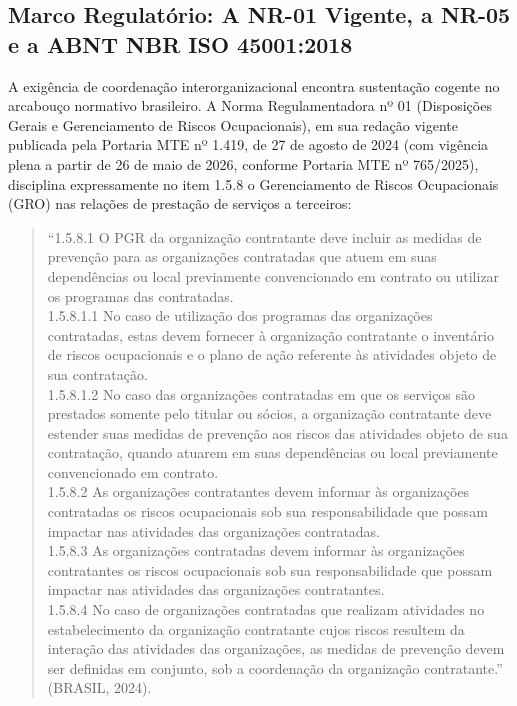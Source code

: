 \documentclass[12pt,a4paper]{article}
\begin{document}
\subsection{Marco Regulatório: A NR-01 Vigente, a NR-05 e a ABNT NBR ISO 45001:2018}

A exigência de coordenação interorganizacional encontra sustentação cogente no arcabouço normativo brasileiro. A Norma Regulamentadora nº 01 (Disposições Gerais e Gerenciamento de Riscos Ocupacionais), em sua redação vigente publicada pela Portaria MTE nº 1.419, de 27 de agosto de 2024 (com vigência plena a partir de 26 de maio de 2026, conforme Portaria MTE nº 765/2025), disciplina expressamente no item 1.5.8 o Gerenciamento de Riscos Ocupacionais (GRO) nas relações de prestação de serviços a terceiros:
\begin{quote}
\fontsize{10}{12}\selectfont\singlespacing
``1.5.8.1 O PGR da organização contratante deve incluir as medidas de prevenção para as organizações contratadas que atuem em suas dependências ou local previamente convencionado em contrato ou utilizar os programas das contratadas.\\
1.5.8.1.1 No caso de utilização dos programas das organizações contratadas, estas devem fornecer à organização contratante o inventário de riscos ocupacionais e o plano de ação referente às atividades objeto de sua contratação.\\
1.5.8.1.2 No caso das organizações contratadas em que os serviços são prestados somente pelo titular ou sócios, a organização contratante deve estender suas medidas de prevenção aos riscos das atividades objeto de sua contratação, quando atuarem em suas dependências ou local previamente convencionado em contrato.\\
1.5.8.2 As organizações contratantes devem informar às organizações contratadas os riscos ocupacionais sob sua responsabilidade que possam impactar nas atividades das organizações contratadas.\\
1.5.8.3 As organizações contratadas devem informar às organizações contratantes os riscos ocupacionais sob sua responsabilidade que possam impactar nas atividades das organizações contratantes.\\
1.5.8.4 No caso de organizações contratadas que realizam atividades no estabelecimento da organização contratante cujos riscos resultem da interação das atividades das organizações, as medidas de prevenção devem ser definidas em conjunto, sob a coordenação da organização contratante.'' (BRASIL, 2024).
\end{quote}
\end{document}
